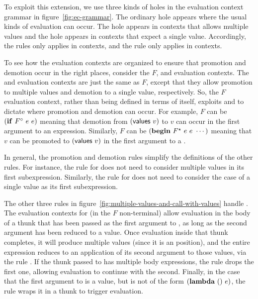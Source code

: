 To exploit this extension, we use three kinds of holes in the
evaluation context grammar in figure~\ref{fig:ec-grammar}. The
ordinary hole \hole{} appears where the usual kinds of
evaluation can occur. The hole \holes{} appears in contexts that
allows multiple values and the hole \holeone{} appears in
contexts that expect a single value. Accordingly, the rules
 only applies in \holes{} contexts, and the
rule  only applies in \holeone{} contexts.

To see how the evaluation contexts are organized to ensure that
promotion and demotion occur in the right places, consider the $F$,
\Fstar{} and \Fo{} evaluation contexts. The \Fstar{} and \Fo{}
evaluation contexts are just the same as $F$, except that they allow
promotion to multiple values and demotion to a single value,
respectively. So, the $F$ evaluation context, rather than being
defined in terms of itself, exploits \Fstar{} and \Fo{} to dictate
where promotion and demotion can occur. For example, $F$ can be
$(\textnormal{\textbf{if}}~F^{\circ}{}~e~e)$ meaning that demotion from $(\textnormal{\textsf{values}}~v)$ to
$v$ can occur in the first argument to an  expression.
Similarly, $F$ can be $(\textnormal{\textbf{begin}}~F^{\star}{}~e~e~\cdots)$ meaning that
$v$ can be promoted to $(\textnormal{\textsf{values}}~v)$ in the first argument to a
.

In general, the promotion and demotion rules simplify the definitions
of the other rules. For instance, the rule for  does not
need to consider multiple values in its first subexpression.
Similarly, the rule for  does not need to consider the
case of a single value as its first subexpression.

The other three rules in
figure~\ref{fig:multiple-values-and-call-with-values} handle
. The evaluation contexts for
 (in the $F$ non-terminal) allow
evaluation in the body of a thunk that has been passed as the first
argument to , as long as the second argument
has been reduced to a value. Once evaluation inside that thunk
completes, it will produce multiple values (since it is an \Fstar{}
position), and the entire  expression reduces
to an application of its second argument to those values, via the rule
. If the thunk passed to  has
multiple body expressions, the rule  drops the first
one, allowing evaluation to continue with the second. Finally, in the
case that the first argument to  is a value,
but is not of the form $(\textnormal{\textbf{lambda}}~()~e)$, the rule
 wraps it in a thunk to trigger evaluation.

